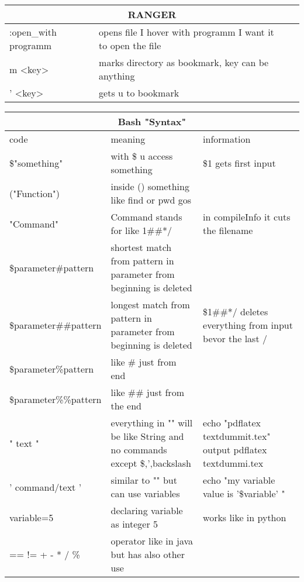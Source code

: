 \documentclass[12pt]{article}
\begin{document}
\begin{tabular}{| p{6.5cm} | p{6.5cm} | p{6.5cm} |}
    \hline
    \multicolumn{3}{|c|}{RANGER} \\
    \hline
    :open\_with programm & opens file I hover with programm I want it to open  the file & \\
    \hline
    m <key> & marks directory as bookmark, key can be anything & \\
    \hline
    ' <key> & gets u to bookmark & \\
    \hline
\end{tabular}

\newpage

\centering
\begin{tabular}{| p{6.5cm} | p{6.5cm} | p{6.5cm} |}
    \hline
    \multicolumn{3}{|c|}{Bash "Syntax"} \\
    \hline
    code & meaning & information\\
    \hline
    \$"something" & with \$ u access something & \$1 gets first input\\
    \hline
    ("Function") & inside () something like find or pwd gos &\\
    \hline
    {"Command"} & Command stands for like 1\#\#*/ & in compileInfo it cuts the filename \\
    \hline
    \${parameter\#pattern} & shortest match from pattern in parameter from beginning is deleted &\\
    \hline 
    \${parameter\#\#pattern} & longest match from pattern in parameter from beginning is deleted & \${1\#\#*/} deletes everything from input bevor the last / \\
    \hline
    \${parameter\%pattern} & like \# just from end &\\
    \hline 
    \${parameter\%\%pattern} & like \#\# just from the end &\\
    \hline 
    " text " & everything in "" will be like String and no commands except \$,',backslash & echo "pdflatex textdummit.tex" output pdflatex textdummi.tex \\
    \hline
    ' command/text ' & similar to "" but can use variables & echo "my variable value is '\$variable' " \\
    \hline 
    variable=5 & declaring variable as integer 5 & works like in python \\
    \hline 
    == != + - * / \% & operator like in java but has also other use &\\
    \hline 
\end{tabular}
\end{document}
